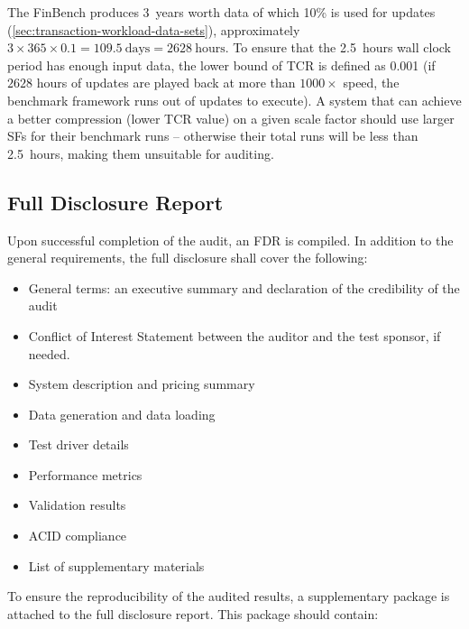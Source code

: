 The FinBench \DataGen produces 3~years worth data of which 10\% is used for updates (\autoref{sec:transaction-workload-data-sets}), \ie approximately $3 \times 365 \times 0.1 = 109.5~\text{days} = 2628~\text{hours}$.
To ensure that the 2.5~hours wall clock period has enough input data, the lower bound of TCR is defined as 0.001 (if $2628$ hours of updates are played back at more than $1000\times$ speed, the benchmark framework runs out of updates to execute). A system that can achieve a better compression (\ie lower TCR value) on a given scale factor should use larger SFs for their benchmark runs -- otherwise their total runs will be less than 2.5~hours, making them unsuitable for auditing.


\subsection{Full Disclosure Report}
\label{sec:transaction-workload-fdr}

Upon successful completion of the audit, an FDR is compiled. In addition to the general requirements, the full disclosure shall cover the following:

\begin{itemize}
    \item General terms: an executive summary and declaration of the credibility of the audit
    \item Conflict of Interest Statement between the auditor and the test sponsor, if needed.
    \item System description and pricing summary
    \item Data generation and data loading
    \item Test driver details
    \item Performance metrics
    \item Validation results
    \item ACID compliance
    \item List of supplementary materials
\end{itemize}

To ensure the reproducibility of the audited results, a supplementary package is attached to the full disclosure report. This package should contain:

